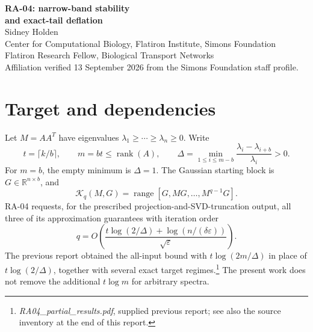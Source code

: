 \documentclass[11pt]{article}
\newcommand{\K}{\mathcal K}
\newcommand{\R}{\mathbb R}
\newcommand{\rank}{\operatorname{rank}}
\newcommand{\range}{\operatorname{range}}
\begin{document}
\begin{center}
{\LARGE\bfseries RA-04: narrow-band stability\\[4pt] and exact-tail deflation}
\\[10pt]
{\large Sidney Holden}\\[3pt]
Center for Computational Biology, Flatiron Institute, Simons Foundation\\
{\small Flatiron Research Fellow, Biological Transport Networks}\\[3pt]
{\small Affiliation verified 13 September 2026 from the Simons Foundation staff profile.}
\end{center}
\begin{abstract}
This continuation establishes a quantitative good-start graph for sufficiently
narrow, nonzero-width leading spectral bands. Barycentric scaling eliminates
dependence on the overall leading spectral condition number. A separate generic
rank argument proves exact recovery when the spectrum below the target cutoff
has few distinct values, with the boundary multiplicity handled explicitly.
The unrestricted RA-04 bound is not established: the width restriction in the
first theorem is substantive, and the second theorem does not cover an arbitrary
diverse tail. The status is \textbf{PARTIAL}.
\end{abstract}
\tableofcontents

\section{Target and dependencies}
Let $M=AA^T$ have eigenvalues $\lambda_1\ge\cdots\ge\lambda_n\ge0$. Write
\[
 t=\lceil k/b\rceil,\qquad m=bt\le\rank(A),\qquad
 \Delta=\min_{1\le i\le m-b}\frac{\lambda_i-\lambda_{i+b}}{\lambda_i}>0.
\]
For $m=b$, the empty minimum is $\Delta=1$. The Gaussian starting block is
$G\in\R^{n\times b}$, and
\[
 \K_q(M,G)=\range[G,MG,\ldots,M^{q-1}G].
\]
RA-04 requests, for the prescribed projection-and-SVD-truncation output, all
three of its approximation guarantees with iteration order
\begin{equation}\label{target}
 q=O\!\left(\frac{t\log(2/\Delta)+\log(n/(\delta\varepsilon))}
 {\sqrt\varepsilon}\right).
\end{equation}
The previous report obtained the all-input bound with $t\log(2m/\Delta)$ in
place of $t\log(2/\Delta)$, together with several exact target regimes.\footnote{
\emph{RA04\_partial\_results.pdf}, supplied previous report; see also the
source inventory at the end of this report.}
The present work does not remove the additional $t\log m$ for arbitrary spectra.
\end{document}
